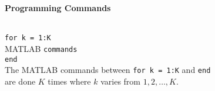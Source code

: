 \documentclass{ximera}
\begin{document}
{\begin{tabbing}
\end{tabbing}
 

\begin{center}
{\bf Programming Commands}
\end{center}
\begin{tabbing}
 \hspace{1.1in} \= \\

     {\tt for k = 1:K}   \>\\
	\hspace{0.1in} MATLAB {\tt commands} \> \\
     {\tt end} \> \\
\> The MATLAB commands between {\tt for k = 1:K} and {\tt end}\\ \>
are done $K$ times where $k$ varies from $1,2,\ldots,K$.

\end{tabbing}
}
\end{document}
